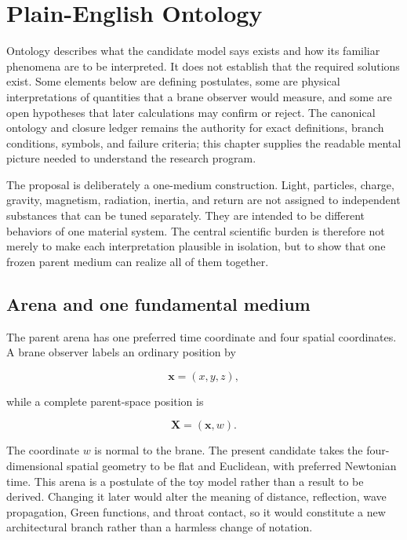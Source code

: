 
\chapter{Plain-English Ontology}
\label{ch:plain-english-ontology}

Ontology describes what the candidate model says exists and how its familiar
phenomena are to be interpreted. It does not establish that the required
solutions exist. Some elements below are defining postulates, some are physical
interpretations of quantities that a brane observer would measure, and some are
open hypotheses that later calculations may confirm or reject. The canonical
ontology and closure ledger remains the authority for exact definitions,
branch conditions, symbols, and failure criteria; this chapter supplies the
readable mental picture needed to understand the research program.

The proposal is deliberately a one-medium construction. Light, particles,
charge, gravity, magnetism, radiation, inertia, and return are not assigned to
independent substances that can be tuned separately. They are intended to be
different behaviors of one material system. The central scientific burden is
therefore not merely to make each interpretation plausible in isolation, but to
show that one frozen parent medium can realize all of them together.

\section{Arena and one fundamental medium}

The parent arena has one preferred time coordinate and four spatial coordinates.
A brane observer labels an ordinary position by

\[
\mathbf x=(x,y,z),
\]

while a complete parent-space position is

\[
\mathbf X=(\mathbf x,w).
\]

The coordinate \(w\) is normal to the brane. The present candidate takes the
four-dimensional spatial geometry to be flat and Euclidean, with preferred
Newtonian time. This arena is a postulate of the toy model rather than a result
to be derived. Changing it later would alter the meaning of distance,
reflection, wave propagation, Green functions, and throat contact, so it would
constitute a new architectural branch rather than a harmless change of
notation.

